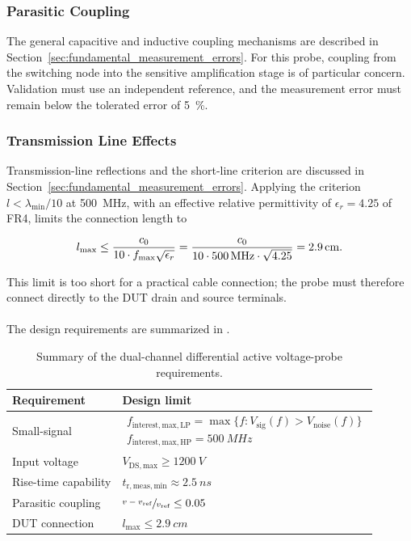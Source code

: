 \subsubsection*{Parasitic Coupling}
The general capacitive and inductive coupling mechanisms are described in Section~\ref{sec:fundamental_measurement_errors}. 
For this probe, coupling from the switching node into the sensitive amplification stage is of particular concern. 
Validation must use an independent reference, and the measurement error must remain below the tolerated error of \SI{5}{\%}.

\subsubsection*{Transmission Line Effects}
Transmission-line reflections and the short-line criterion are discussed in Section~\ref{sec:fundamental_measurement_errors}. Applying the criterion $l < \lambda_{\min}/10$ at \SI{500}{MHz}, with an effective relative permittivity of $\epsilon_r=4.25$ of FR4, limits the connection length to

\begin{align}
    {l}_{\mathrm{max}} \leq \frac{c_0}{10\cdot{f}_{\mathrm{max}}\sqrt{\epsilon_r}}
    = \frac{c_0}{10\cdot \SI{500}{MHz}\cdot \sqrt{4.25}}
    = \SI{2.9}{cm}.
\end{align}

This limit is too short for a practical cable connection; the probe must therefore connect directly to the DUT drain and source terminals.
\\
\\
The design requirements are summarized in .

\begin{table}[htbp]
\centering
\caption{Summary of the dual-channel differential active voltage-probe requirements.}
\label{tab:VoltageProbeRequirements}
\renewcommand{\arraystretch}{1.25}
\begin{tabularx}{0.8\textwidth}{>{\raggedright\arraybackslash}p{} >{\centering\arraybackslash}X}
    \toprule
    \textbf{Requirement} & \textbf{Design limit} \\
    \midrule
    Small-signal & $\begin{gathered}                        
                        f_{\mathrm{interest,max,LP}}=\max\{f: V_{\mathrm{sig}}(f)>V_{\mathrm{noise}}(f)\}\\
                        f_{\mathrm{interest,max,HP}}=\SI{500}{MHz}
                    \end{gathered}$ \\
    Input voltage & $V_{\mathrm{DS,max}}\geq\SI{1200}{V}$ \\
    Rise-time capability & $t_{\mathrm{r,meas,min}}\approx\SI{2.5}{ns}$\\
    Parasitic coupling & $\sfrac{v-{v}_{\mathrm{ref}}}{{v}_{\mathrm{ref}}} \leq 0.05$\\
    DUT connection & $l_{\max}\leq\SI{2.9}{cm}$\\
    \bottomrule
\end{tabularx}
\end{table}